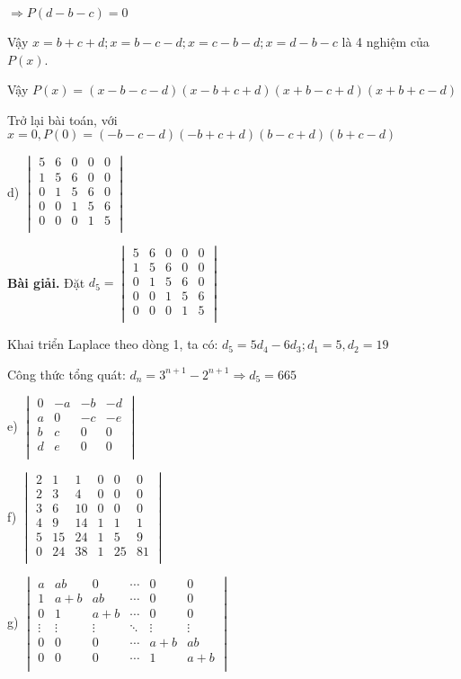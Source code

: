 \documentclass[12pt]{report}
\begin{document}
$\Rightarrow P(d-b-c) = 0$

Vậy $x=b+c+d; x=b-c-d; x=c-b-d; x=d-b-c$ là 4 nghiệm của $P(x)$.

Vậy $P(x)=(x-b-c-d)(x-b+c+d)(x+b-c+d)(x+b+c-d)$  

Trở lại bài toán, với $x = 0, P(0) = (-b-c-d)(-b+c+d)(b-c+d)(b+c-d)$

d) $\begin{vmatrix}
	5 & 6 & 0 & 0 & 0 \\
	1 & 5 & 6 & 0 & 0 \\
	0 & 1 & 5 & 6 & 0 \\
	0 & 0 & 1 & 5 & 6 \\
	0 & 0 & 0 & 1 & 5 \\
\end{vmatrix}$

\textbf{Bài giải.} Đặt $d_5 = \begin{vmatrix}
	5 & 6 & 0 & 0 & 0 \\
	1 & 5 & 6 & 0 & 0 \\
	0 & 1 & 5 & 6 & 0 \\
	0 & 0 & 1 & 5 & 6 \\
	0 & 0 & 0 & 1 & 5 \\
\end{vmatrix}$

Khai triển Laplace theo dòng 1, ta có: $d_5 = 5d_4 -6d_3; d_1 = 5, d_2 = 19$

Công thức tổng quát: $d_n = 3^{n+1} - 2^{n+1} \Rightarrow d_5 = 665$

e) $\begin{vmatrix}
	0 & -a & -b & -d \\
	a & 0 & -c & -e \\
	b & c & 0 & 0 \\
	d & e & 0 & 0 \\
\end{vmatrix}$

f) $\begin{vmatrix}
	2 & 1 & 1 & 0 & 0 & 0 \\
	2 & 3 & 4 & 0 & 0 & 0 \\
	3 & 6 & 10 & 0 & 0 & 0 \\
	4 & 9 & 14 & 1 & 1 & 1 \\
	5 & 15 & 24 & 1 & 5 & 9 \\
	0 & 24 & 38 & 1 & 25 & 81 \\
\end{vmatrix}$

g) $\begin{vmatrix}
	a & ab & 0 & \cdots & 0 & 0 \\
	1 & a+b & ab & \cdots & 0 & 0 \\
	0 & 1 & a+b & \cdots & 0 & 0 \\
	\vdots & \vdots & \vdots & \ddots & \vdots & \vdots \\
	0 & 0 & 0 & \cdots & a+b & ab \\
	0 & 0 & 0 & \cdots & 1 & a+b \\
\end{vmatrix}$
\end{document}

